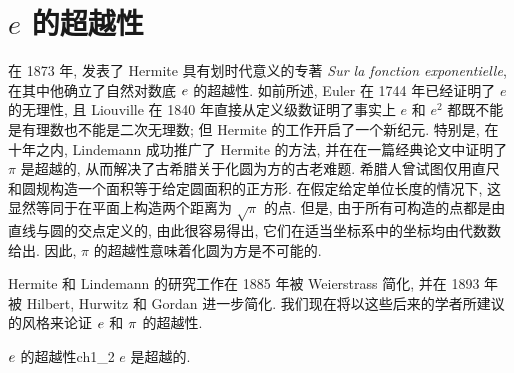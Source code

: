 \section{$e$ 的超越性}

在 1873 年, 发表了 Hermite 具有划时代意义的专著 \textit{Sur la fonction exponentielle}, 在其中他确立了自然对数底 $e\index{transcendence of e}$ 的超越性. 如前所述, Euler 在 1744 年已经证明了 $e$ 的无理性, 且 Liouville 在 1840 年直接从定义级数证明了事实上 $e$ 和 $e^2$ 都既不能是有理数也不能是二次无理数; 但 Hermite 的工作开启了一个新纪元. 特别是, 在十年之内, Lindemann 成功推广了 Hermite 的方法, 并在在一篇经典论文中证明了 $\pi$ 是超越的, 从而解决了古希腊关于化圆为方的古老难题. 希腊人曾试图仅用直尺和圆规构造一个面积等于给定圆面积的正方形. 在假定给定单位长度的情况下, 这显然等同于在平面上构造两个距离为 $\sqrt{\pi}$ 的点. 但是, 由于所有可构造的点都是由直线与圆的交点定义的, 由此很容易得出, 它们在适当坐标系中的坐标均由代数数给出. 因此, $\pi$ 的超越性意味着化圆为方是不可能的.

Hermite 和 Lindemann 的研究工作在 1885 年被 Weierstrass 简化, 并在 1893 年被 Hilbert, Hurwitz 和 Gordan 进一步简化. 我们现在将以这些后来的学者所建议的风格来论证 $e\index{transcendence of e}$ 和 $\pi\index{transcendence of  $\pi$}$ 的超越性.

\begin{mythm}{$e\index{transcendence of e}$ 的超越性}{ch1_2}
$e$ 是超越的.
\end{mythm}

